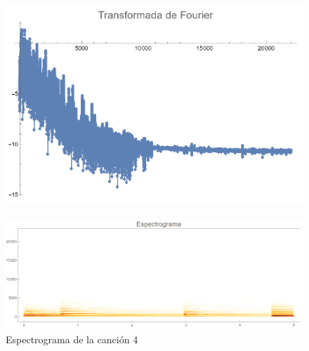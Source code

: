 \documentclass[12pt, letterpaper]{article}
\begin{document}
\begin{figure}[H]
  \centering
  \begin{minipage}{.4\linewidth}
    \centering
    \includegraphics[width=\linewidth]{imgs/Cancion4/transformada.png}
    \label{fig:04a}
  \end{minipage}
  \begin{minipage}{0.07\textwidth}\end{minipage}
  \begin{minipage}{.47\linewidth}
    \centering
    \includegraphics[width=\linewidth]{imgs/Cancion4/espectrograma.png}
    \caption{Espectrograma de la canción 4}
    \label{fig:04i}
  \end{minipage}
\end{figure}
\end{document}

